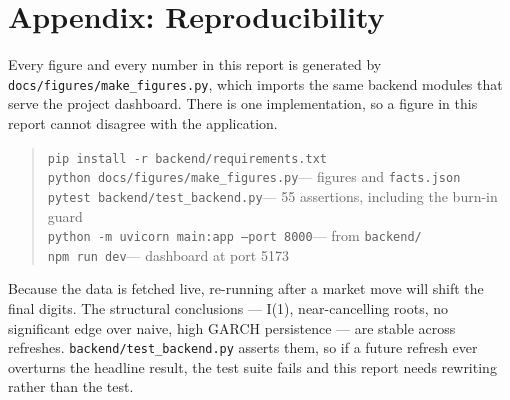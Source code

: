 \documentclass[12pt,a4paper]{article}
\newcommand{\code}[1]{{\small\texttt{#1}}}
\begin{document}
\section*{Appendix: Reproducibility}

Every figure and every number in this report is generated by
\code{docs/figures/make\_figures.py}, which imports the same backend modules that
serve the project dashboard. There is one implementation, so a figure in this
report cannot disagree with the application.

\begin{quote}
\code{pip install -r backend/requirements.txt}\\
\code{python docs/figures/make\_figures.py}\quad --- figures and \code{facts.json}\\
\code{pytest backend/test\_backend.py}\quad --- 55 assertions, including the burn-in guard\\
\code{python -m uvicorn main:app --port 8000}\quad --- from \code{backend/}\\
\code{npm run dev}\quad --- dashboard at port 5173
\end{quote}

Because the data is fetched live, re-running after a market move will shift the
final digits. The structural conclusions --- I(1), near-cancelling roots, no
significant edge over naive, high GARCH persistence --- are stable across
refreshes. \code{backend/test\_backend.py} asserts them, so if a future refresh
ever overturns the headline result, the test suite fails and this report needs
rewriting rather than the test.
\end{document}
